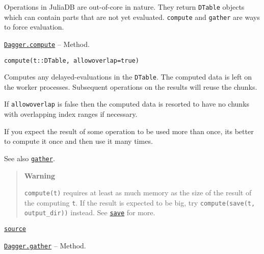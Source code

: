 \documentclass{memoir}
\begin{document}
Operations in JuliaDB are out-of-core in nature. They return \texttt{DTable} objects which can contain parts that are not yet evaluated. \texttt{compute} and \texttt{gather} are ways to force evaluation.


\hypertarget{13382488477989679622}{} 
\hyperlink{13382488477989679622}{\texttt{Dagger.compute}}  -- {Method.}

\begin{adjustwidth}{2em}{0pt}


\begin{lstlisting}
compute(t::DTable, allowoverlap=true)
\end{lstlisting}

Computes any delayed-evaluations in the \texttt{DTable}. The computed data is left on the worker processes. Subsequent operations on the results will reuse the chunks.

If \texttt{allowoverlap} is false then the computed data is resorted to have no chunks with overlapping index ranges if necessary.

If you expect the result of some operation to be used more than once, it{\textquotesingle}s better to compute it once and then use it many times.

See also \href{apireference.html\#Dagger.gather-Tuple\{JuliaDB.DTable\}}{\texttt{gather}}.

\begin{quote}
\textbf{Warning}

\texttt{compute(t)} requires at least as much memory as the size of the result of the computing \texttt{t}. If the result is expected to be big, try \texttt{compute(save(t, {\textquotedbl}output\_dir{\textquotedbl}))} instead. See \href{tutorial.html\#JuliaDB.save}{\texttt{save}} for more.

\end{quote}


\href{https://github.com/JuliaComputing/JuliaDB.jl/tree/9e65f8c3b0e9c2e27c3334a093a5aefc6c7d1246/src/dtable.jl#L42-L61}{\texttt{source}}


\end{adjustwidth}
\hypertarget{9294741057127988533}{} 
\hyperlink{9294741057127988533}{\texttt{Dagger.gather}}  -- {Method.}
\end{document}
